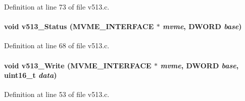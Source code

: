 Definition at line 73 of file v513.c.
\paragraph[{v513\_\-Status}]{\setlength{\rightskip}{0pt plus 5cm}void v513\_\-Status ({\bf MVME\_\-INTERFACE} $\ast$ {\em mvme}, \/  {\bf DWORD} {\em base})}\hfill\label{v513_8c_ab0b49bcd59c5d1a7225a8b2dc65078ab}


Definition at line 68 of file v513.c.
\paragraph[{v513\_\-Write}]{\setlength{\rightskip}{0pt plus 5cm}void v513\_\-Write ({\bf MVME\_\-INTERFACE} $\ast$ {\em mvme}, \/  {\bf DWORD} {\em base}, \/  uint16\_\-t {\em data})}\hfill\label{v513_8c_aeb673802fc74239f08841a9dee0921d6}


Definition at line 53 of file v513.c.